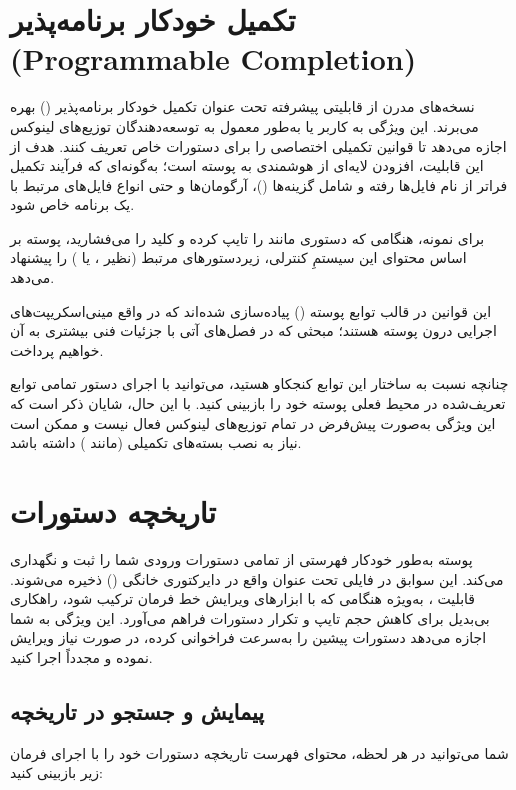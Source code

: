 \section{تکمیل خودکار برنامه‌پذیر (Programmable Completion)}

نسخه‌های مدرن  از قابلیتی پیشرفته تحت عنوان تکمیل خودکار برنامه‌پذیر () بهره می‌برند. این ویژگی به کاربر یا به‌طور معمول به توسعه‌دهندگان توزیع‌های لینوکس اجازه می‌دهد تا قوانین تکمیلی اختصاصی را برای دستورات خاص تعریف کنند. هدف از این قابلیت، افزودن لایه‌ای از هوشمندی به پوسته است؛ به‌گونه‌ای که فرآیند تکمیل فراتر از نام فایل‌ها رفته و شامل گزینه‌ها ()، آرگومان‌ها و حتی انواع فایل‌های مرتبط با یک برنامه خاص شود.

برای نمونه، هنگامی که دستوری مانند  را تایپ کرده و کلید  را می‌فشارید، پوسته بر اساس محتوای این سیستمِ کنترلی، زیردستورهای مرتبط (نظیر ،  یا ) را پیشنهاد می‌دهد.

این قوانین در قالب توابع پوسته () پیاده‌سازی شده‌اند که در واقع مینی‌اسکریپت‌های اجرایی درون پوسته هستند؛ مبحثی که در فصل‌های آتی با جزئیات فنی بیشتری به آن خواهیم پرداخت.

چنانچه نسبت به ساختار این توابع کنجکاو هستید، می‌توانید با اجرای دستور  تمامی توابع تعریف‌شده در محیط فعلی پوسته خود را بازبینی کنید. با این حال، شایان ذکر است که این ویژگی به‌صورت پیش‌فرض در تمام توزیع‌های لینوکس فعال نیست و ممکن است نیاز به نصب بسته‌های تکمیلی (مانند ) داشته باشد.

\section{تاریخچه دستورات}

پوسته  به‌طور خودکار فهرستی از تمامی دستورات ورودی شما را ثبت و نگهداری می‌کند. این سوابق در فایلی تحت عنوان  واقع در دایرکتوری خانگی () ذخیره می‌شوند. قابلیت ، به‌ویژه هنگامی که با ابزارهای ویرایش خط فرمان ترکیب شود، راهکاری بی‌بدیل برای کاهش حجم تایپ و تکرار دستورات فراهم می‌آورد. این ویژگی به شما اجازه می‌دهد دستورات پیشین را به‌سرعت فراخوانی کرده، در صورت نیاز ویرایش نموده و مجدداً اجرا کنید.

\subsection{پیمایش و جستجو در تاریخچه}

شما می‌توانید در هر لحظه، محتوای فهرست تاریخچه دستورات خود را با اجرای فرمان زیر بازبینی کنید:

